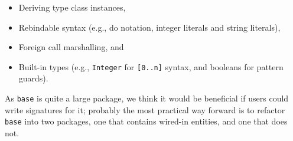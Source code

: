 \begin{itemize}
    \item Deriving type class instances,
    \item Rebindable syntax (e.g., do notation, integer literals
          and string literals),
    \item Foreign call marshalling, and
    \item Built-in types (e.g., \verb|Integer| for \verb|[0..n]|
          syntax, and booleans for pattern guards).
\end{itemize}
%
As \verb|base| is quite a large package, we think it would be beneficial
if users could write signatures for it; probably the most practical
way forward is to refactor \verb|base| into two packages, one that
contains wired-in entities, and one that does not.






